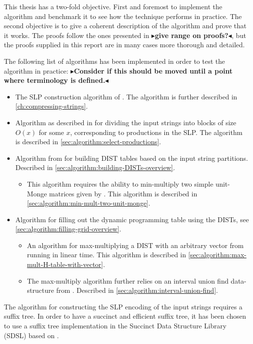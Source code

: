\documentclass[twoside,11pt,openright]{report}
\newcommand{\todo}[1]{{\color[rgb]{.5,0,0}\textbf{$\blacktriangleright$#1$\blacktriangleleft$}}}
\begin{document}
This thesis has a two-fold objective. First and foremost to implement the algorithm and benchmark it to see how the technique performs in practice. The second objective is to give a coherent description of the algorithm and prove that it works. The proofs follow the ones presented in \cite{DBLP:journals/corr/abs-0707-3619} \todo{give range on proofs?}, but the proofs supplied in this report are in many cases more thorough and detailed.

The following list of algorithms has been implemented in order to test the algorithm in practice:
\todo{Consider if this should be moved until a point where terminology is defined.}
\begin{itemize}
  \item The SLP construction algorithm of \cite{Rytter2003211}. The algorithm is further described in \cref{ch:compressing-strings}.
  \item Algorithm as described in \cite{DBLP:journals/corr/abs-1004-1194} for dividing the input strings into blocks of size $O(x)$ for some $x$, corresponding to productions in the SLP. The algorithm is described in \cref{sec:algorithm:select-productions}.
  \item Algorithm from \cite{DBLP:journals/corr/abs-1004-1194} for building DIST tables based on the input string partitions. Described in \cref{sec:algorithm:building-DISTs-overview}.
    \begin{itemize}
      \item This algorithm requires the ability to min-multiply two simple unit-Monge matrices given by \cite{Tiskin:2010:FDM:1873601.1873704}. This algorithm is described in \cref{sec:algorithm:min-mult-two-unit-monge}.
    \end{itemize}
  \item Algorithm for filling out the dynamic programming table using the DISTs, see \cref{sec:algorithm:filling-grid-overview}.
    \begin{itemize}
      \item An algorithm for max-multiplying a DIST with an arbitrary vector from \cite{Gawrychowski:2012:FAC:2422024.2422048} running in linear time. This algorithm is described in \cref{sec:algorithm:max-mult-H-table-with-vector}.
      \item The max-multiply algorithm further relies on an interval union find data-structure from \cite{Itai06lineartime}. Described in \cref{sec:algorithm:interval-union-find}.
    \end{itemize}
\end{itemize}
The algorithm for constructing the SLP encoding of the input strings requires a suffix tree. In order to have a succinct and efficient suffix tree, it has been chosen to use a suffix tree implementation in the Succinct Data Structure Library (SDSL) \cite{SDSL} based on \cite{OHL:FIS:GOG:2010}.
\end{document}
